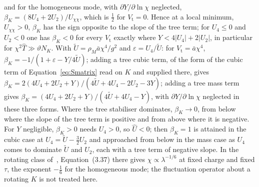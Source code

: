 and for the homogeneous mode, with \(\partial Y/\partial\ln\chi\) neglected, \(\beta_K=(8U_4+2U_2)/U_{\chi\chi}\), which is \(\tfrac12\) for \(V_{\mathrm t}=0\). Hence at a local minimum, \(U_{\chi\chi}>0\), \(\beta_K\) has the sign opposite to the slope of the tree term; for \(U_4\le0\) and \(U_2<0\) one has \(\beta_K<0\) for every \(V_{\mathrm t}\) exactly where \(Y<4|U_4|+2|U_2|\), in particular for \(\chi^2\hat T\gg\vartheta N_K\). With \(\tilde U=\rho_M\bar a\chi^4/g^2\) and \(\varepsilon=U_4/\tilde U\): for \(V_{\mathrm t}=\bar a\chi^4\), \(\beta_K=-1/(1+\varepsilon-Y/4\tilde U)\); adding a tree cubic term, of the form of the cubic term of Equation~\eqref{eq:Smatrix} read on \(K\) and supplied there, gives \(\beta_K=2(4U_4+2U_2+Y)/(4\tilde U+4U_4-2U_2-3Y)\); adding a tree mass term gives \(\beta_K=(4U_4+2U_2+Y)/(4\tilde U+4U_4-Y)\), with \(\partial Y/\partial\ln\chi\) neglected in these three forms. Where the tree stabiliser dominates, \(\beta_K\to0\), from below where the slope of the tree term is positive and from above where it is negative. For \(Y\) negligible, \(\beta_K>0\) needs \(U_4>0\), so \(\hat U<0\); then \(\beta_K=1\) is attained in the cubic case at \(U_4=\tilde U-\tfrac32U_2\) and approached from below in the mass case as \(U_4\) comes to dominate \(\tilde U\) and \(U_2\), each with a tree term of negative slope. In the rotating class of~\cite{MantaSteinacker2025b}, Equation~(3.37) there gives \(\chi\propto\lambda^{-1/6}\) at fixed charge and fixed \(\tau\), the exponent \(-\tfrac16\) for the homogeneous mode; the fluctuation operator about a rotating \(K\) is not treated here.

